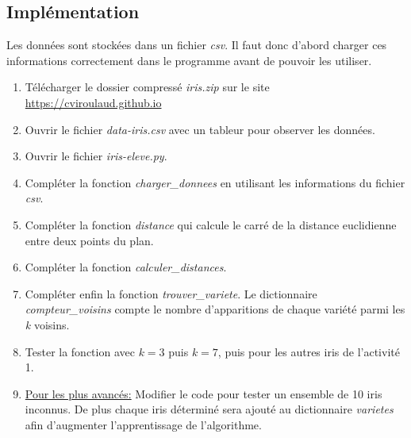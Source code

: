 \documentclass[a4paper,11pt]{article}
\begin{document}
\subsection{Implémentation}
Les données sont stockées dans un fichier \emph{csv}. Il faut donc d'abord charger ces informations correctement dans le programme avant de pouvoir les utiliser.
\begin{activite}
\begin{enumerate}
    \item Télécharger le dossier compressé \emph{iris.zip} sur le site \url{https://cviroulaud.github.io}
    \item Ouvrir le fichier \emph{data-iris.csv} avec un tableur pour observer les données.
    \item Ouvrir le fichier \emph{iris-eleve.py}.
    \item Compléter la fonction \emph{charger\_donnees} en utilisant les informations du fichier \emph{csv}.
    \item Compléter la fonction \emph{distance} qui calcule le carré de la distance euclidienne entre deux points du plan.
    \item Compléter la fonction \emph{calculer\_distances}.
    \item Compléter enfin la fonction \emph{trouver\_variete}. Le dictionnaire \emph{compteur\_voisins} compte le nombre d'apparitions de chaque variété parmi les \emph{k} voisins.
    \item Tester la fonction avec $k=3$ puis $k=7$, puis pour les autres iris de l'activité 1.
    \item \underline{Pour les plus avancés:} Modifier le code pour tester un ensemble de 10 iris inconnus. De plus chaque iris déterminé sera ajouté au dictionnaire \emph{varietes} afin d'augmenter l'apprentissage de l'algorithme.
\end{enumerate}
\end{activite}
\end{document}
